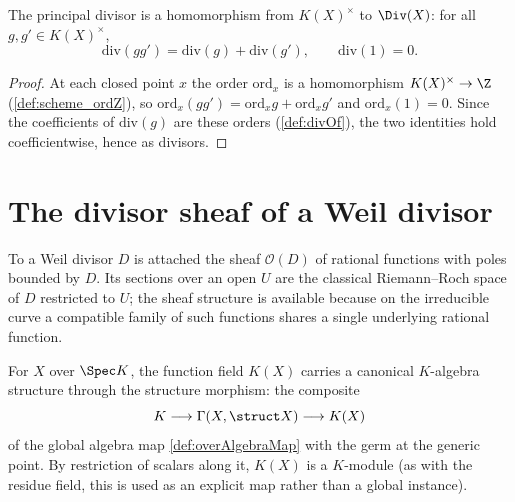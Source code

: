 \begin{theorem}
  \label{thm:divOf_hom}
  \leanok
  The principal divisor is a homomorphism from \(K(X)^\times\) to \(\Div(X)\): for all
  \(g, g' \in K(X)^\times\),
  \[
    \mathrm{div}(g g') = \mathrm{div}(g) + \mathrm{div}(g'), \qquad \mathrm{div}(1) = 0 .
  \]
\end{theorem}
\begin{proof}
  \leanok
  At each closed point \(x\) the order \(\mathrm{ord}_x\) is a homomorphism \(K(X)^\times \to \Z\)
  (\ref{def:scheme_ordZ}), so \(\mathrm{ord}_x(g g') = \mathrm{ord}_x g + \mathrm{ord}_x g'\) and
  \(\mathrm{ord}_x(1) = 0\). Since the coefficients of \(\mathrm{div}(g)\) are these orders
  (\ref{def:divOf}), the two identities hold coefficientwise, hence as divisors.
\end{proof}

\section{The divisor sheaf of a Weil divisor}

To a Weil divisor \(D\) is attached the sheaf \(\mathcal O(D)\) of rational functions with poles
bounded by \(D\). Its sections over an open \(U\) are the classical Riemann--Roch space of \(D\)
restricted to \(U\); the sheaf structure is available because on the irreducible curve a compatible
family of such functions shares a single underlying rational function.

\begin{definition}
  \label{def:functionFieldOverAlgebraMap}
  \leanok
  For \(X\) over \(\Spec K\), the function field \(K(X)\) carries a canonical \(K\)-algebra structure
  through the structure morphism: the composite
  \[
    K \longrightarrow \Gamma(X, \struct X) \longrightarrow K(X)
  \]
  of the global algebra map \ref{def:overAlgebraMap} with the germ at the generic point. By
  restriction of scalars along it, \(K(X)\) is a \(K\)-module (as with the residue field, this is
  used as an explicit map rather than a global instance).
\end{definition}

